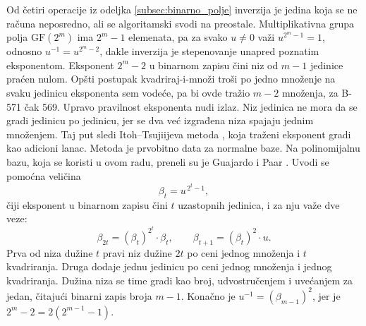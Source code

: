 Od četiri operacije iz odeljka \ref{subsec:binarno_polje} inverzija je jedina koja se ne računa neposredno, ali se algoritamski svodi na preostale. Multiplikativna grupa polja $\mathrm{GF}(2^m)$ ima $2^m - 1$ elemenata, pa za svako $u \neq 0$ važi $u^{2^m - 1} = 1$, odnosno $u^{-1} = u^{2^m - 2}$, dakle inverzija je stepenovanje unapred poznatim eksponentom.
\smallbreak
Eksponent $2^m - 2$ u binarnom zapisu čini niz od $m-1$ jedinice praćen nulom. Opšti postupak kvadriraj-i-množi troši po jedno množenje na svaku jedinicu eksponenta sem vodeće, pa bi ovde tražio $m-2$ množenja, za B-571 čak 569. Upravo pravilnost eksponenta nudi izlaz. Niz jedinica ne mora da se gradi jedinicu po jedinicu, jer se dva već izgrađena niza spajaju jednim množenjem. Taj put sledi Itoh--Tsujiijeva metoda \cite{itoh_tsujii}, koja traženi eksponent gradi kao adicioni lanac. Metoda je prvobitno data za normalne baze. Na polinomijalnu bazu, koja se koristi u ovom radu, preneli su je Guajardo i Paar \cite{guajardo_paar}. Uvodi se pomoćna veličina
\begin{equation}
    \beta_t = u^{\,2^t - 1},
    \label{eq:itoh_beta}
\end{equation}
čiji eksponent u binarnom zapisu čini $t$ uzastopnih jedinica, i za nju važe dve veze:
\begin{equation}
    \beta_{2t} = \left(\beta_t\right)^{2^t} \cdot \beta_t, \qquad
    \beta_{t+1} = \left(\beta_t\right)^{2} \cdot u.
    \label{eq:itoh_rekurzija}
\end{equation}
Prva od niza dužine $t$ pravi niz dužine $2t$ po ceni jednog množenja i $t$ kvadriranja. Druga dodaje jednu jedinicu po ceni jednog množenja i jednog kvadriranja. Dužina niza se time gradi kao broj, udvostručenjem i uvećanjem za jedan, čitajući binarni zapis broja $m-1$. Konačno je $u^{-1} = \left(\beta_{m-1}\right)^2$, jer je $2^m - 2 = 2\left(2^{m-1} - 1\right)$.

